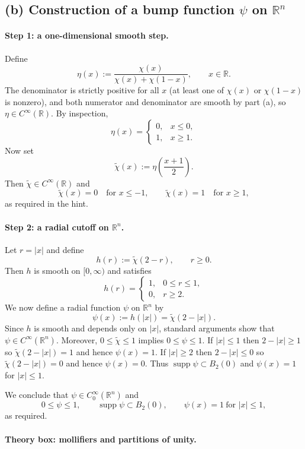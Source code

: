 \documentclass[12pt,a4paper]{article}
\theoremstyle{plain}
\theoremstyle{definition}
\theoremstyle{remark}
\theoremstyle{remark}
\begin{document}
\subsection*{(b) Construction of a bump function $\psi$ on $\mathbb{R}^n$}

\paragraph{Step 1: a one-dimensional smooth step.}
Define
\[
\eta(x) := \frac{\chi(x)}{\chi(x)+\chi(1-x)}, \qquad x\in\mathbb{R}.
\]
The denominator is strictly positive for all $x$ (at least one of
$\chi(x)$ or $\chi(1-x)$ is nonzero), and both numerator and denominator
are smooth by part (a), so $\eta\in C^\infty(\mathbb{R})$.  By inspection,
\[
\eta(x) =
\begin{cases}
	0, & x\le 0,\\
	1, & x\ge 1.
\end{cases}
\]
Now set
\[
\tilde\chi(x) := \eta\!\left(\frac{x+1}{2}\right).
\]
Then $\tilde\chi\in C^\infty(\mathbb{R})$ and
\[
\tilde\chi(x)=0 \quad\text{for }x\le -1,\qquad
\tilde\chi(x)=1 \quad\text{for }x\ge 1,
\]
as required in the hint.

\paragraph{Step 2: a radial cutoff on $\mathbb{R}^n$.}
Let $r=|x|$ and define
\[
h(r) := \tilde\chi(2-r), \qquad r\ge 0.
\]
Then $h$ is smooth on $[0,\infty)$ and satisfies
\[
h(r) =
\begin{cases}
	1, & 0\le r\le 1,\\
	0, & r\ge 2.
\end{cases}
\]
We now define a radial function $\psi$ on $\mathbb{R}^n$ by
\[
\psi(x) := h(|x|) = \tilde\chi(2-|x|).
\]
Since $h$ is smooth and depends only on $|x|$, standard arguments show
that $\psi\in C^\infty(\mathbb{R}^n)$.  Moreover,
$0\le\tilde\chi\le 1$ implies $0\le\psi\le 1$.  If $|x|\le 1$ then
$2-|x|\ge 1$ so $\tilde\chi(2-|x|)=1$ and hence $\psi(x)=1$.  If
$|x|\ge 2$ then $2-|x|\le 0$ so $\tilde\chi(2-|x|)=0$ and hence
$\psi(x)=0$.  Thus $\operatorname{supp}\psi\subset B_2(0)$ and
$\psi(x)=1$ for $|x|\le 1$.

We conclude that $\psi\in C_0^\infty(\mathbb{R}^n)$ and
\[
0\le\psi\le 1,\qquad
\operatorname{supp}\psi\subset B_2(0),\qquad
\psi(x)=1\ \text{for }|x|\le 1,
\]
as required.

\paragraph{Theory box: mollifiers and partitions of unity.}
\end{document}
